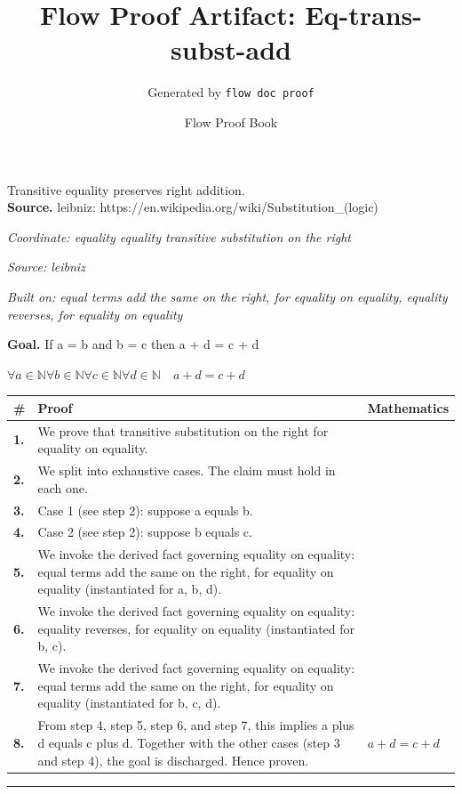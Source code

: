 \documentclass[11pt]{article}
\title{Flow Proof Artifact: Eq-trans-subst-add}
\author{Generated by \texttt{flow doc proof}}
\date{Flow Proof Book}
\theoremstyle{definition}
\begin{document}
\maketitle
Transitive equality preserves right addition.\\[0.5em]
\textbf{Source.} leibniz: https://en.wikipedia.org/wiki/Substitution\_(logic)\\[0.5em]
\bigskip
{}\par
\smallskip\noindent\textit{Coordinate: equality \cdot equality \cdot transitive substitution on the right}\par
\smallskip\noindent\textit{Source: leibniz}\par
\smallskip\noindent\textit{Built on: equal terms add the same on the right, for equality on equality, equality reverses, for equality on equality}\par
\medskip
\noindent\textbf{Goal.} If a = b and b = c then a + d = c + d\par
\noindent$\displaystyle \forall a \in \mathbb{N} \forall b \in \mathbb{N} \forall c \in \mathbb{N} \forall d \in \mathbb{N}\quad a + d = c + d$\par
\medskip
\noindent
\begin{tabular}{@{} >{\raggedright\arraybackslash}p{} >{\raggedright\arraybackslash}p{} >{\raggedleft\arraybackslash}p{} @{}}
\textbf{\#} & \textbf{Proof} & \textbf{Mathematics} \\
\midrule
\textbf{1.} & We prove that transitive substitution on the right for equality on equality. & \\[0.45em]
\textbf{2.} & We split into exhaustive cases. The claim must hold in each one. & \\[0.45em]
\textbf{3.} & Case 1 (see step 2): suppose a  equals  b. & \\[0.45em]
\textbf{4.} & Case 2 (see step 2): suppose b  equals  c. & \\[0.45em]
\textbf{5.} & We invoke the derived fact governing equality on equality: equal terms add the same on the right, for equality on equality (instantiated for a, b, d). & \\[0.45em]
\textbf{6.} & We invoke the derived fact governing equality on equality: equality reverses, for equality on equality (instantiated for b, c). & \\[0.45em]
\textbf{7.} & We invoke the derived fact governing equality on equality: equal terms add the same on the right, for equality on equality (instantiated for b, c, d). & \\[0.45em]
\textbf{8.} & From step 4, step 5, step 6, and step 7, this implies a plus d equals c plus d. Together with the other cases (step 3 and step 4), the goal is discharged. Hence proven. & $\displaystyle a + d = c + d$ \\[0.45em]
\bottomrule
\end{tabular}
\label{thm:Eq-equality-transitive_substitution_on_the_right}
\par\medskip\hrule
\end{document}
